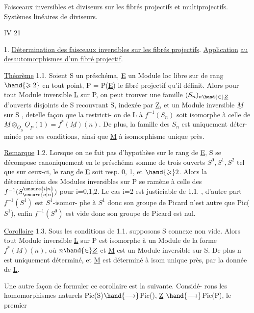 Faisceaux inversibles et diviseurs sur les fibrés projectifs et multiprojectifs. Systèmes linéaires de diviseurs. 

IV 21 

1. \uline{Détermination des faisceaux inversibles sur les fibrés projectifs}.
\uline{Application} \uline{au  des}\hand{/}\uline{automorphismes d'un fibré projectif}.

\uline{Théorème} 1.1. Soient S un préschéma, \underline{E} un Module loc libre sur  de
rang  $\hand{\geqslant 2}$ en tout point,
 P = P(\underline{E}) le fibré projectif qu'il définit. Alors
\placedmargin{\unsure{*|+}} pour tout Module inversible \underline{L} sur P, on peut trouver une famille
 $(S_n)_{n\hand{\in}\underline{Z}}$ d'ouverts disjoints de S recouvrant S, indexée par \underline{Z}, et
 un Module inversible $\underline{M}$ sur S , detelle façon que
 la restricti-%
on de \underline{L} à $f^{-1}(S_n)$ soit isomorphe à celle de $\underline{M}\otimes_{\underline{O}_S}\underline{O}_P(1) = f^*(\underline{M})(n)$.
De plus, la  famille des $S_n$  est uniquement déter-%
minée par ses conditions, ainsi que \underline{M} à isomorphisme unique près.

\uline{Remarque} 1.2. Lorsque on ne fait pas d'hypothèse sur le rang de \underline{E}, S se
décompose canoniquement en le préschéma somme de trois ouverts $S^0,S^1,S^2$ tel que sur
ceux-ci, le rang de \underline{E} soit resp. 0, 1, et $\hand{\geqslant} 2$. Alors la détermination des
Modules inversibles sur P se ramène à celle des $f^{-1}(S^{\unsure{i|n}}_{\unsure{a|n}})$ pour i=0,1,2.
Le cas i=2 est justiciable de 1.1. , d'autre part $f^{-1}(S^1)$ est $S^1$-isomor-%
phe à $S^1$ donc son groupe de Picard n'est autre que Pic($S^1$), enfin
$f^{-1}(S^0)$ est vide donc son groupe de Picard est nul.

\uline{Corollaire} 1.3. Sous les conditions de 1.1. supposons S connexe non vide. Alors
tout Module inversible \underline{L} sur P est isomorphe à un Module de la forme
$f^*(\underline{M})(n)$, où $n\hand{\in}\underline{Z}$ et \underline{M} est un Module inversible sur S. De plus n est
uniquement déterminé, et \underline{M} est déterminé à isom unique près, par la donnée
de \underline{L}.\placedmargin{\ensuremath{\swarrow}}

Une autre façon de formuler ce corollaire est la suivante. Considé-%
rons les homomorphismes naturels Pic(S)$\hand{\longrightarrow}$Pic(), \underline{Z} $\hand{\longrightarrow}$Pic(P), le premier\placedmargin{\ensuremath{\swarrow}}
